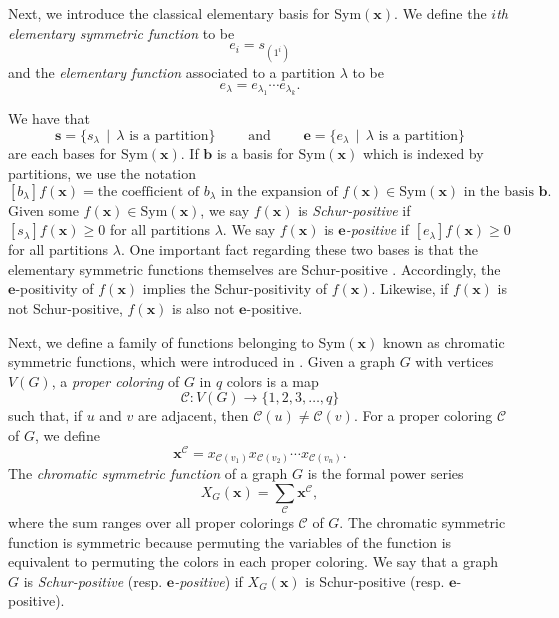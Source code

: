 \documentclass[12pt]{amsart}
\newcommand{\andd}{\qquad\text{ and }\qquad}
\numberwithin{equation}{section}
\theoremstyle{plain}
\theoremstyle{definition}
\theoremstyle{remark}
\begin{document}
Next, we introduce the classical elementary basis for Sym$(\mathbf{x})$. We define the \textit{$i$th elementary symmetric function} to be
    \[
    e_i=s_{(1^i)}
    \]
    and the \textit{elementary function} associated to a partition $\lambda$ to be
    \[
    e_{\lambda}=e_{\lambda_1}\cdots e_{\lambda_{k}}.
    \]


We have that
\[
\mathbf{s}=\{s_{\lambda}\,\mid\, \lambda\text{ is a partition}\}\andd \mathbf{e}=\{e_{\lambda}\,\mid\, \lambda\text{ is a partition}\}
\]
are each bases for $\text{Sym}(\mathbf{x})$. If $\textbf{b}$ is a basis for $\text{Sym}(\mathbf{x})$ which is indexed by partitions, we use the notation
\[
[b_{\lambda}]f(\mathbf{x})= \text{the coefficient of $b_{\lambda}$ in the expansion of $f(\mathbf{x})\in \text{Sym}(\mathbf{x})$ in the basis $\mathbf{b}$}. 
\]
Given some $f(\mathbf{x})\in \text{Sym}(\mathbf{x})$, we say $f(\mathbf{x})$ is \textit{Schur-positive} if $[s_{\lambda}]f(\mathbf{x})\ge 0$ for all partitions $\lambda$. We say $f(\mathbf{x})$ is \textit{$\mathbf{e}$-positive} if $[e_{\lambda}]f(\mathbf{x})\ge 0$ for all partitions $\lambda$. One important fact regarding these two bases is that the elementary symmetric functions themselves are Schur-positive \cite{ERemmel}. Accordingly, the $\mathbf{e}$-positivity of $f(\mathbf{x})$ implies the Schur-positivity of $f(\mathbf{x})$. Likewise, if $f(\mathbf{x})$ is not Schur-positive, $f(\mathbf{x})$ is also not $\mathbf{e}$-positive.






Next, we define a family of functions belonging to Sym$(\mathbf{x})$ known as chromatic symmetric functions, which were introduced in \cite{stan_95}. Given a graph $G$ with vertices $V(G)$, a \textit{proper coloring} of $G$ in $q$ colors is a map
\[
\mathcal{C}:V(G)\to\{1,2,3,\dots, q\}
\]
such that, if $u$ and $v$ are adjacent, then $\mathcal{C}(u)\ne \mathcal{C}(v)$. For a proper coloring $\mathcal{C}$ of $G$, we define
    \[
\mathbf{x}^{\mathcal{C}}=x_{\mathcal{C}(v_1)}x_{\mathcal{C}(v_2)}\cdots x_{\mathcal{C}(v_n)}.
    \]
    The \textit{chromatic symmetric function} of a graph $G$ is the formal power series
\[
X_G(\mathbf{x})=\sum_{\mathcal{C}}\mathbf{x}^{\mathcal{C}},
\]
where the sum ranges over all proper colorings $\mathcal{C}$ of $G$.
    The chromatic symmetric function is symmetric because permuting the variables of the function is equivalent to permuting the colors in each proper coloring. We say that a graph $G$ is \textit{Schur-positive} (resp. \textit{$\mathbf{e}$-positive}) if $X_G(\mathbf{x})$ is Schur-positive (resp. $\mathbf{e}$-positive). 
\end{document}
